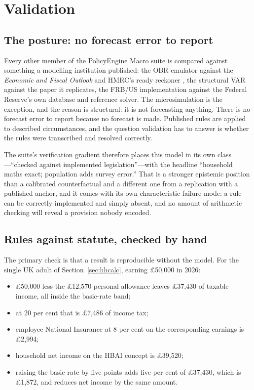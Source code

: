 \section{Validation}
\label{sec:validation}

\subsection{The posture: no forecast error to report}

Every other member of the PolicyEngine Macro suite is compared against something a modelling institution published: the OBR emulator against the \emph{Economic and Fiscal Outlook} and HMRC's ready reckoner \citep{ahmadi2026obr}, the structural VAR against the paper it replicates, the FRB/US implementation against the Federal Reserve's own database and reference solver. The microsimulation is the exception, and the reason is structural: it is not forecasting anything. There is no forecast error to report because no forecast is made. Published rules are applied to described circumstances, and the question validation has to answer is whether the rules were transcribed and resolved correctly.

The suite's verification gradient therefore places this model in its own class---``checked against implemented legislation''---with the headline ``household maths exact; population adds survey error.'' That is a stronger epistemic position than a calibrated counterfactual and a different one from a replication with a published anchor, and it comes with its own characteristic failure mode: a rule can be correctly implemented and simply absent, and no amount of arithmetic checking will reveal a provision nobody encoded.

\subsection{Rules against statute, checked by hand}

The primary check is that a result is reproducible without the model. For the single UK adult of Section~\ref{sec:hhcalc}, earning \pounds 50{,}000 in 2026:

\begin{itemize}
\item \pounds 50{,}000 less the \pounds 12{,}570 personal allowance leaves \pounds 37{,}430 of taxable income, all inside the basic-rate band;
\item at 20 per cent that is \pounds 7{,}486 of income tax;
\item employee National Insurance at 8 per cent on the corresponding earnings is \pounds 2{,}994;
\item household net income on the HBAI concept is \pounds 39{,}520;
\item raising the basic rate by five points adds five per cent of \pounds 37{,}430, which is \pounds 1{,}872, and reduces net income by the same amount.
\end{itemize}

